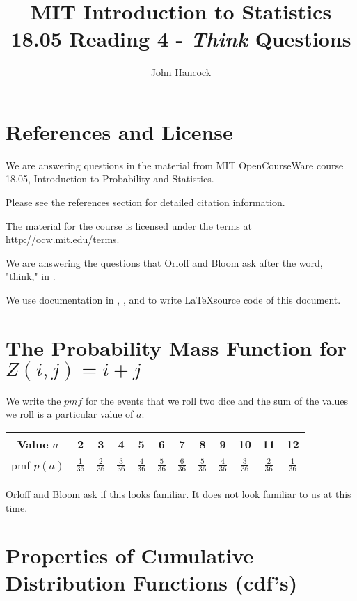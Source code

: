 \documentclass[a4paper,11pt]{article}
\author{John Hancock}
\title{MIT Introduction to Statistics 18.05 Reading 4 - \textit{Think}
  Questions }
\begin{document}
\maketitle
\tableofcontents
\section{References and License}
We are answering questions in the material from MIT OpenCourseWare
course 18.05, Introduction to Probability and Statistics.

Please see the references section for detailed citation information.

The material for the course is licensed under the terms at 
\url{http://ocw.mit.edu/terms}.

We are answering the questions that Orloff and Bloom ask after
the word, "think," in \cite{reading4}.

We use documentation in \cite{latexSymbols}, \cite{limHowTo}, and
\cite{htmlLatexSymbols} to write \LaTeX source code of this
document.
 
\label{prob1}
\section{The Probability Mass Function for $ Z\left( i, j \right) = i + j$}

We write the $pmf$ for the events that we roll two dice and the sum
of the values we roll is a particular value of $a$:
\begin{center}
  \begin{tabular}{ | c | c | c | c | c |c |c | c | c | c | c |c |}
    \hline
    Value $a$ & 2 & 3 & 4 & 5 & 6 & 7 & 8 & 9 & 10 & 11 & 12\\ \hline
    pmf $p \left( a \right)$  & $\frac{1}{36}$ & $\frac{2}{36}$ & 
      $\frac{3}{36}$ & $\frac{4}{36}$ & $\frac{5}{36}$ & 
      $\frac{6}{36}$ & $\frac{5}{36}$ & $\frac{4}{36}$ & 
      $\frac{3}{36}$ & $\frac{2}{36}$ & $\frac{1}{36}$\\ \hline
  \end{tabular}
\end{center}

Orloff and Bloom ask if this looks familiar.  It does not look familiar
to us at this time.

\section{Properties of Cumulative Distribution Functions (cdf's)}
\end{document}
